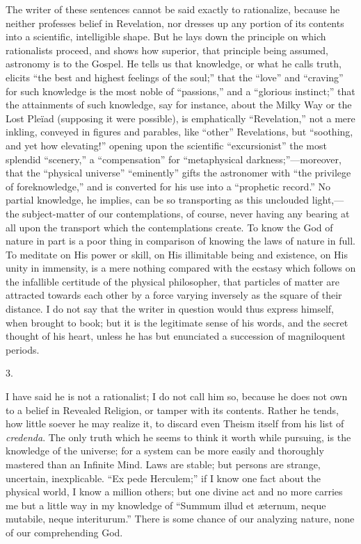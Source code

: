 The writer of these sentences cannot be said
exactly to rationalize, because he neither professes belief in
Revelation, nor dresses up any portion of its contents into a
scientific, intelligible shape. But he lays down the principle on
which rationalists proceed, and shows how superior, that principle
being assumed, astronomy is to the Gospel. He tells us that knowledge,
or what he calls truth, elicits ``the best and highest feelings of
the soul;'' that the ``love'' and ``craving'' for such knowledge
is the most noble of ``passions,'' and a ``glorious instinct;''
that the attainments of such knowledge, say for instance, about the
Milky Way or the Lost Pleïad (supposing it were possible), is
emphatically ``Revelation,'' not a mere inkling, conveyed in figures
and parables, like ``other'' Revelations, but ``soothing, and yet
how elevating!'' opening upon the scientific ``excursionist''
the most splendid ``scenery,'' a ``compensation'' for ``metaphysical darkness;''—moreover, that the
``physical
universe'' ``eminently'' gifts the astronomer with ``the privilege
of foreknowledge,'' and is converted for his use into a ``prophetic
record.'' No partial knowledge, he implies, can be so transporting as
this unclouded light,—the subject-matter of our contemplations, of
course, never having any bearing at all upon the transport which the
contemplations create. To know the God of nature in part is a poor
thing in comparison of knowing the laws of nature in full. To meditate
on His power or skill, on His illimitable being and existence, on His
unity in immensity, is a mere nothing compared with the ecstasy which
follows on the infallible certitude of the physical philosopher, that
particles of matter are attracted towards each other by a force
varying inversely as the square of their distance. I do not say that
the writer in question would thus express himself, when brought to
book; but it is the legitimate sense of his words, and the secret
thought of his heart, unless he has but enunciated a succession of
magniloquent periods.

3.

I have said he is not a rationalist; I do not
call him so, because he does not own to a belief in Revealed Religion,
or tamper with its contents. Rather he tends, how little soever he may
realize it, to discard even Theism itself from his list of \emph{credenda}.
The only truth which he seems to think it worth while pursuing, is the
knowledge of the universe; for a system can be more easily and
thoroughly mastered than an Infinite Mind. Laws are stable; but
persons are strange, uncertain, inexplicable. ``Ex pede Herculem;''
if I know one fact about the physical world, I know a million
others; but one divine act and no more carries me but a little way in
my knowledge of ``Summum illud et æternum, neque mutabile, neque
interiturum.'' There is some chance of our analyzing nature, none of
our comprehending God.

